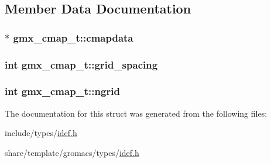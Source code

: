 \subsection{\-Member \-Data \-Documentation}
\hypertarget{structgmx__cmap__t_aed2a574424956e2fd4160984fed57df8}{
\subsubsection[{cmapdata}]{ $\ast$ {\bf gmx\-\_\-cmap\-\_\-t\-::cmapdata}}}\label{structgmx__cmap__t_aed2a574424956e2fd4160984fed57df8}
\hypertarget{structgmx__cmap__t_a33fff24fdd8af811e3cab88f85a684d4}{
\subsubsection[{grid\-\_\-spacing}]{\setlength{\rightskip}{0pt plus 5cm}int {\bf gmx\-\_\-cmap\-\_\-t\-::grid\-\_\-spacing}}}\label{structgmx__cmap__t_a33fff24fdd8af811e3cab88f85a684d4}
\hypertarget{structgmx__cmap__t_a1a1b7ca5da1c10b1b32ce4d347e28bcb}{
\subsubsection[{ngrid}]{\setlength{\rightskip}{0pt plus 5cm}int {\bf gmx\-\_\-cmap\-\_\-t\-::ngrid}}}\label{structgmx__cmap__t_a1a1b7ca5da1c10b1b32ce4d347e28bcb}


\-The documentation for this struct was generated from the following files\-:\begin{DoxyCompactItemize}
\item 
include/types/\hyperlink{include_2types_2idef_8h}{idef.\-h}\item 
share/template/gromacs/types/\hyperlink{share_2template_2gromacs_2types_2idef_8h}{idef.\-h}\end{DoxyCompactItemize}
